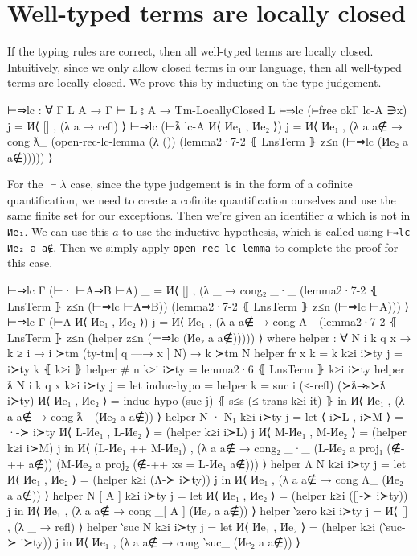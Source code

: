 \documentclass[logo,bsc,singlespacing,parskip,online]{infthesis}
\begin{document}
\section{Well-typed terms are locally closed}
If the typing rules are correct, then all well-typed terms are locally closed. Intuitively, since we
only allow closed terms in our language, then all well-typed terms are locally closed. We prove this by inducting on the type judgement.
\begin{code}
  ⊢⇒lc : ∀ {Γ L A} → Γ ⊢ L ⦂ A → Tm-LocallyClosed L
  ⊢⇒lc (⊢free okΓ lc-A ∋x) j = И⟨ [] , (λ a → refl) ⟩
  ⊢⇒lc (⊢ƛ lc-A И⟨ Иe₁ , Иe₂ ⟩) j = И⟨ Иe₁ , (λ a {a∉} → cong ƛ_
    (open-rec-lc-lemma (λ ())
      (lemma2·7-2 ⦃ LnsTerm ⦄ z≤n (⊢⇒lc (Иe₂ a {a∉}))))) ⟩
\end{code}
For the $\vdash\lambda$ case, since the type judgement is in the form of a cofinite quantification,
we need to create a cofinite quantification ourselves and use the same finite set for our
exceptions. Then we're given an identifier $a$ which is not in \texttt{Иe₁}. We can use this $a$ to
use the inductive hypothesis, which is called using \texttt{⊢⇒lc Иe₂ a {a∉}}. Then we simply apply
\texttt{open-rec-lc-lemma} to complete the proof for this case.
\begin{code}
  ⊢⇒lc {Γ} (⊢· ⊢A⇒B ⊢A) _ = И⟨ [] , (λ _ → cong₂ _·_
    (lemma2·7-2 ⦃ LnsTerm ⦄ z≤n (⊢⇒lc ⊢A⇒B))
    (lemma2·7-2 ⦃ LnsTerm ⦄ z≤n (⊢⇒lc ⊢A))) ⟩
  ⊢⇒lc {Γ} (⊢Λ И⟨ Иe₁ , Иe₂ ⟩) j =
    И⟨ Иe₁ , (λ a {a∉} →
      cong Λ_ (lemma2·7-2 ⦃ LnsTerm ⦄ z≤n
        (helper z≤n (⊢⇒lc (Иe₂ a {a∉}))))) ⟩
    where
      helper : ∀ {N i k q x} → k ≥ i → i ≻tm (ty-tm[ q —→ x ] N)
        → k ≻tm N
      helper {fr x} {k = k} k≥i i≻ty j = i≻ty k ⦃ k≥i ⦄
      helper {# n} k≥i i≻ty = lemma2·6 ⦃ LnsTerm ⦄ k≥i i≻ty
      helper {ƛ N} {i} {k} {q} {x} k≥i i≻ty j =
        let induc-hypo = helper {k = suc i} (≤-refl) (≻ƛ⇒s≻ƛ i≻ty)
            И⟨ Иe₁ , Иe₂ ⟩ = induc-hypo (suc j) ⦃ s≤s (≤-trans k≥i it) ⦄
        in И⟨ Иe₁ , (λ a {a∉} → cong ƛ_ (Иe₂ a {a∉})) ⟩
      helper {N · N₁} k≥i i≻ty j =
        let ⟨ i≻L  , i≻M ⟩ = ·-≻ i≻ty
            И⟨ L-Иe₁ , L-Иe₂ ⟩ = (helper k≥i i≻L) j
            И⟨ M-Иe₁ , M-Иe₂ ⟩ = (helper k≥i i≻M) j
          in И⟨ (L-Иe₁ ++ M-Иe₁) , (λ a {a∉} → cong₂ _·_
            (L-Иe₂ a {proj₁ (∉-++ a∉)})
            (M-Иe₂ a {proj₂ (∉-++ {xs = L-Иe₁} a∉)})) ⟩
      helper {Λ N} k≥i i≻ty j =
        let И⟨ Иe₁ , Иe₂ ⟩ = (helper k≥i (Λ-≻ i≻ty)) j
        in И⟨ Иe₁ , (λ a {a∉} → cong Λ_ (Иe₂ a {a∉})) ⟩
      helper {N [ A ]} k≥i i≻ty j =
        let И⟨ Иe₁ , Иe₂ ⟩ = (helper k≥i ([]-≻ i≻ty)) j
        in И⟨ Иe₁ , (λ a {a∉} → cong _[ A ] (Иe₂ a {a∉})) ⟩
      helper {‵zero} k≥i i≻ty j = И⟨ [] , (λ _ → refl) ⟩
      helper {‵suc N} k≥i i≻ty j =
        let И⟨ Иe₁ , Иe₂ ⟩ = (helper k≥i (‵suc-≻ i≻ty)) j
        in И⟨ Иe₁ , (λ a {a∉} → cong ‵suc_ (Иe₂ a {a∉})) ⟩
\end{code}
\end{document}
